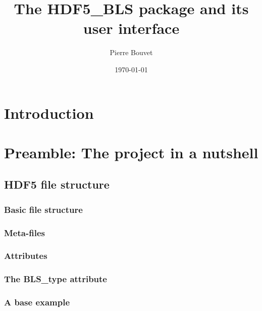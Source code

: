 \documentclass{book}
\title{The HDF5\_BLS package and its user interface}
\author{Pierre Bouvet}
\date{\today}
\begin{document}
\maketitle

\tableofcontents

\chapter*{Introduction}
    

    
\chapter*{Preamble: The project in a nutshell}
    \section*{HDF5 file structure}
        \subsection*{Basic file structure}
            
        \subsection*{Meta-files}
            
        \subsection*{Attributes}
            
        \subsection*{The BLS\_type attribute}\label{subsec:preamble.file_structure.complete_structure}
            
        \subsection*{A base example}\label{subsec:preamble.file_structure.some_examples}
            
\end{document}
